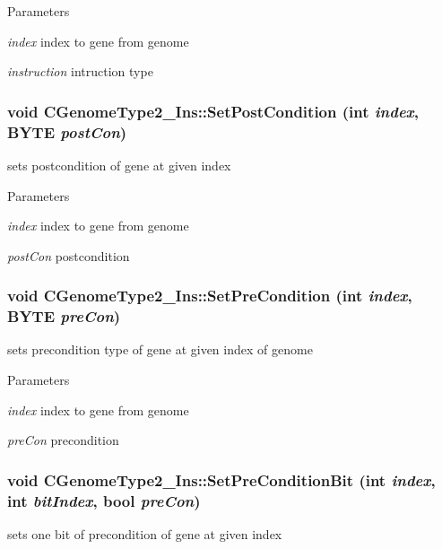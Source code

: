 \begin{DoxyParams}{Parameters}
\item[{\em index}]index to gene from genome \item[{\em instruction}]intruction type \end{DoxyParams}
\hypertarget{classCGenomeType2__Ins_a073bf5cc9b04d06d92d9a80c300c1238}{
\subsubsection[{SetPostCondition}]{\setlength{\rightskip}{0pt plus 5cm}void CGenomeType2\_\-Ins::SetPostCondition (int {\em index}, \/  BYTE {\em postCon})}}
\label{classCGenomeType2__Ins_a073bf5cc9b04d06d92d9a80c300c1238}
sets postcondition of gene at given index


\begin{DoxyParams}{Parameters}
\item[{\em index}]index to gene from genome \item[{\em postCon}]postcondition \end{DoxyParams}
\hypertarget{classCGenomeType2__Ins_af983154bb5cb502effe57484e4d0cdd9}{
\subsubsection[{SetPreCondition}]{\setlength{\rightskip}{0pt plus 5cm}void CGenomeType2\_\-Ins::SetPreCondition (int {\em index}, \/  BYTE {\em preCon})}}
\label{classCGenomeType2__Ins_af983154bb5cb502effe57484e4d0cdd9}
sets precondition type of gene at given index of genome


\begin{DoxyParams}{Parameters}
\item[{\em index}]index to gene from genome \item[{\em preCon}]precondition \end{DoxyParams}
\hypertarget{classCGenomeType2__Ins_a109dc11d7cbfa8fd630729bdcbe35e58}{
\subsubsection[{SetPreConditionBit}]{\setlength{\rightskip}{0pt plus 5cm}void CGenomeType2\_\-Ins::SetPreConditionBit (int {\em index}, \/  int {\em bitIndex}, \/  bool {\em preCon})}}
\label{classCGenomeType2__Ins_a109dc11d7cbfa8fd630729bdcbe35e58}
sets one bit of precondition of gene at given index


